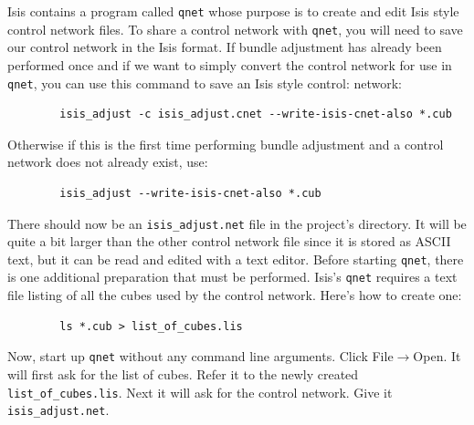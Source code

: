 Isis contains a program called \texttt{qnet} whose purpose is to
create and edit Isis style control network files. To share a control
network with \texttt{qnet}, you will need to save our control network
in the Isis format. If bundle adjustment has already been performed
once and if we want to simply convert the control network for use in
\texttt{qnet}, you can use this command to save an Isis style control:
network:

\begin{verbatim}
        isis_adjust -c isis_adjust.cnet --write-isis-cnet-also *.cub
\end{verbatim}

Otherwise if this is the first time performing bundle adjustment and a
control network does not already exist, use:

\begin{verbatim}
        isis_adjust --write-isis-cnet-also *.cub
\end{verbatim}

There should now be an \verb=isis_adjust.net= file in the project's
directory. It will be quite a bit larger than the other control
network file since it is stored as ASCII text, but it can be read and
edited with a text editor. Before starting \texttt{qnet}, there is one
additional preparation that must be performed. Isis's \texttt{qnet} requires
a text file listing of all the cubes used by the control
network. Here's how to create one:

\begin{verbatim}
        ls *.cub > list_of_cubes.lis
\end{verbatim}

Now, start up \texttt{qnet} without any command line arguments. Click
File$\rightarrow$Open. It will first ask for the list of cubes. Refer
it to the newly created \texttt{list\_of\_cubes.lis}. Next it will ask for
the control network. Give it \texttt{isis\_adjust.net}.

\begin{center}
\end{center}

